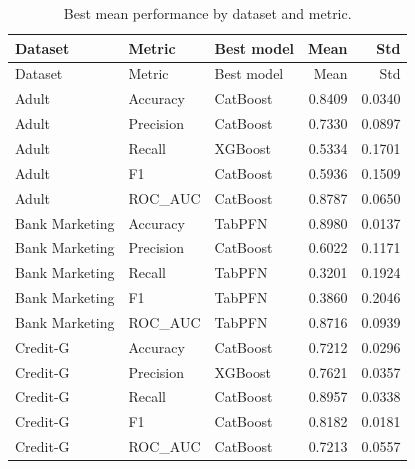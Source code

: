 \begin{longtable}{llLNN}
\caption{Best mean performance by dataset and metric.}\label{tab:best-models}\\
\toprule
Dataset & Metric & Best model & Mean & Std \\
\midrule
\endfirsthead
\toprule
Dataset & Metric & Best model & Mean & Std \\
\midrule
\endhead
Adult & Accuracy & CatBoost & 0.8409 & 0.0340 \\
Adult & Precision & CatBoost & 0.7330 & 0.0897 \\
Adult & Recall & XGBoost & 0.5334 & 0.1701 \\
Adult & F1 & CatBoost & 0.5936 & 0.1509 \\
Adult & ROC\_AUC & CatBoost & 0.8787 & 0.0650 \\
Bank Marketing & Accuracy & TabPFN & 0.8980 & 0.0137 \\
Bank Marketing & Precision & CatBoost & 0.6022 & 0.1171 \\
Bank Marketing & Recall & TabPFN & 0.3201 & 0.1924 \\
Bank Marketing & F1 & TabPFN & 0.3860 & 0.2046 \\
Bank Marketing & ROC\_AUC & TabPFN & 0.8716 & 0.0939 \\
Credit-G & Accuracy & CatBoost & 0.7212 & 0.0296 \\
Credit-G & Precision & XGBoost & 0.7621 & 0.0357 \\
Credit-G & Recall & CatBoost & 0.8957 & 0.0338 \\
Credit-G & F1 & CatBoost & 0.8182 & 0.0181 \\
Credit-G & ROC\_AUC & CatBoost & 0.7213 & 0.0557 \\
\bottomrule
\end{longtable}
